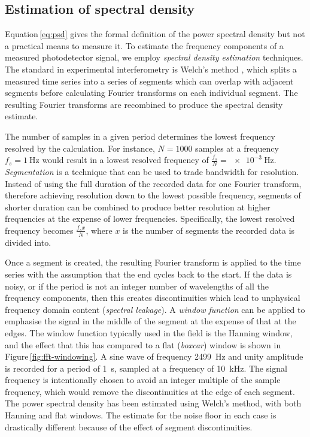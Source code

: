 \subsection{\label{sec:windowing}Estimation of spectral density}
Equation\,\ref{eq:psd} gives the formal definition of the power spectral density but not a practical means to measure it. To estimate the frequency components of a measured photodetector signal, we employ \emph{spectral density estimation} techniques. The standard in experimental interferometry is Welch's method \cite{Welch1967}, which splits a measured time series into a series of segments which can overlap with adjacent segments before calculating Fourier transforms on each individual segment. The resulting Fourier transforms are recombined to produce the spectral density estimate.

The number of samples in a given period determines the lowest frequency resolved by the calculation. For instance, $N = \num{1000}$ samples at a frequency $f_s = \SI{1}{\hertz}$ would result in a lowest resolved frequency of $\frac{f_s}{N} = \SI{e-3}{\hertz}$. \emph{Segmentation} is a technique that can be used to trade bandwidth for resolution. Instead of using the full duration of the recorded data for one Fourier transform, therefore achieving resolution down to the lowest possible frequency, segments of shorter duration can be combined to produce better resolution at higher frequencies at the expense of lower frequencies. Specifically, the lowest resolved frequency becomes $\frac{f_s x}{N}$, where $x$ is the number of segments the recorded data is divided into.

Once a segment is created, the resulting Fourier transform is applied to the time series with the assumption that the end cycles back to the start. If the data is noisy, or if the period is not an integer number of wavelengths of all the frequency components, then this creates discontinuities which lead to unphysical frequency domain content (\emph{spectral leakage}). A \emph{window function} can be applied to emphasise the signal in the middle of the segment at the expense of that at the edges. The window function typically used in the field is the Hanning window, and the effect that this has compared to a flat (\emph{boxcar}) window is shown in Figure\,\ref{fig:fft-windowing}. A sine wave of frequency \SI{2499}{\hertz} and unity amplitude is recorded for a period of \SI{1}{\second}, sampled at a frequency of \SI{10}{\kilo\hertz}. The signal frequency is intentionally chosen to avoid an integer multiple of the sample frequency, which would remove the discontinuities at the edge of each segment. The power spectral density has been estimated using Welch's method, with both Hanning and flat windows. The estimate for the noise floor in each case is drastically different because of the effect of segment discontinuities.

